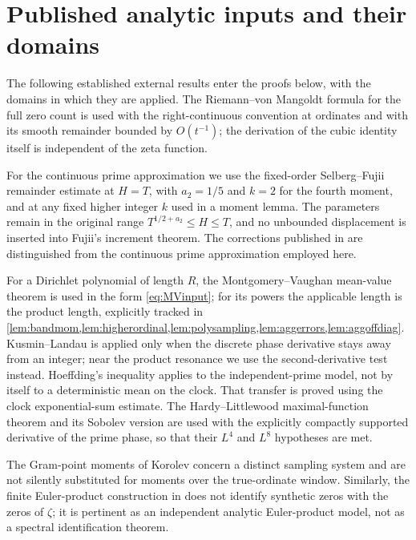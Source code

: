 \documentclass[11pt,reqno]{amsart}
\numberwithin{equation}{section}
\begin{document}
\section{Published analytic inputs and their domains}\label{sec:inputs}
The following established external results enter the proofs below,
with the domains in which they are applied.
The Riemann--von Mangoldt formula for the full zero count is used
with the right-continuous convention at ordinates and with its smooth
remainder bounded by $O(t^{-1})$; the derivation of the cubic identity
itself is independent of the zeta function.

For the continuous prime approximation we use the fixed-order
Selberg--Fujii remainder estimate at $H=T$, with $a_2=1/5$ and
$k=2$ for the fourth moment, and at any fixed higher integer
$k$ used in a moment lemma.  The parameters remain in the original
range $T^{1/2+a_2}\le H\le T$, and no unbounded displacement
is inserted into Fujii's increment theorem.  The corrections
published in \cite{Fujii1981} are distinguished from the
continuous prime approximation employed here.

For a Dirichlet polynomial of length $R$, the Montgomery--Vaughan
mean-value theorem is used in the form \eqref{eq:MVinput}; for its
powers the applicable length is the product length, explicitly
tracked in \cref{lem:bandmom,lem:higherordinal,lem:polysampling,lem:aggerrors,lem:aggoffdiag}.  Kusmin--Landau is applied only when
the discrete phase derivative stays away from an integer; near the
product resonance we use the second-derivative test instead.
Hoeffding's inequality applies to the independent-prime model,
not by itself to a deterministic mean on the clock.  That transfer
is proved using the clock exponential-sum estimate.
The Hardy--Littlewood maximal-function theorem and its Sobolev
version \cite{Stein1970,Kinnunen1997} are used with the explicitly compactly supported derivative
of the prime phase, so that their $L^4$ and $L^8$ hypotheses are met.

The Gram-point moments of Korolev concern a distinct sampling system
and are not silently substituted for moments over the true-ordinate
window.  Similarly, the finite Euler-product construction in
\cite{Gonek2012} does not identify synthetic zeros with the
zeros of $\zeta$; it is pertinent as an independent analytic
Euler-product model, not as a spectral identification theorem.
\end{document}
